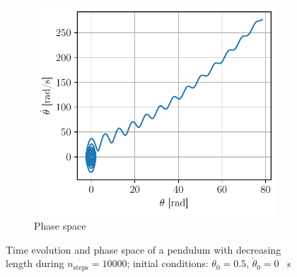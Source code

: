 \begin{figure}[h]
\begin{subfigure}{0.48\linewidth}
        \includegraphics[width=\linewidth]{figures/phase_retraction.pdf}
        \caption{Phase space}
        \label{fig:retract_phase}
    \end{subfigure}
    \caption{Time evolution and phase space of a pendulum with decreasing length during \mbox{$n_\mathrm{steps} = 10000$}; initial conditions: $\theta_0 = 0.5$, $\dot{\theta}_0 = 0$ \si{\per\second}}
\end{figure}

